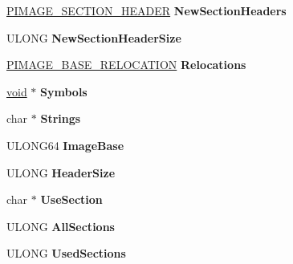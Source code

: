 \begin{DoxyCompactItemize}
\item 
\mbox{\label{struct_f_i_l_e___i_n_f_o_a79ac252b2fc580f5acf767727152aca6}} 
\hyperlink{struct___i_m_a_g_e___s_e_c_t_i_o_n___h_e_a_d_e_r}{P\+I\+M\+A\+G\+E\+\_\+\+S\+E\+C\+T\+I\+O\+N\+\_\+\+H\+E\+A\+D\+ER} {\bfseries New\+Section\+Headers}
\item 
\mbox{\label{struct_f_i_l_e___i_n_f_o_aea6dcb8b41dfed055823aa36f3b6d013}} 
U\+L\+O\+NG {\bfseries New\+Section\+Header\+Size}
\item 
\mbox{\label{struct_f_i_l_e___i_n_f_o_af827c7c23ec827fb3b68f06c57c83316}} 
\hyperlink{struct___i_m_a_g_e___b_a_s_e___r_e_l_o_c_a_t_i_o_n}{P\+I\+M\+A\+G\+E\+\_\+\+B\+A\+S\+E\+\_\+\+R\+E\+L\+O\+C\+A\+T\+I\+ON} {\bfseries Relocations}
\item 
\mbox{\label{struct_f_i_l_e___i_n_f_o_a4f5e7769fbcc7eab188b7ab579e7c8fb}} 
\hyperlink{interfacevoid}{void} $\ast$ {\bfseries Symbols}
\item 
\mbox{\label{struct_f_i_l_e___i_n_f_o_a7531569ea67dc3a66b1687c06c4d0dab}} 
char $\ast$ {\bfseries Strings}
\item 
\mbox{\label{struct_f_i_l_e___i_n_f_o_a33f542f5c8e8f2ddde00806cb4f03883}} 
U\+L\+O\+N\+G64 {\bfseries Image\+Base}
\item 
\mbox{\label{struct_f_i_l_e___i_n_f_o_aa86836cf5e85b47a19af0bbb42c2eb52}} 
U\+L\+O\+NG {\bfseries Header\+Size}
\item 
\mbox{\label{struct_f_i_l_e___i_n_f_o_ac9496d1bc529960c140a49877ba94a85}} 
char $\ast$ {\bfseries Use\+Section}
\item 
\mbox{\label{struct_f_i_l_e___i_n_f_o_a4fb2159f8032ddbca5dfa88c6e05d2c6}} 
U\+L\+O\+NG {\bfseries All\+Sections}
\item 
\mbox{\label{struct_f_i_l_e___i_n_f_o_ad1ba854661fc0f4c94a01a134bc466ff}} 
U\+L\+O\+NG {\bfseries Used\+Sections}
\item 

\end{DoxyCompactItemize}
